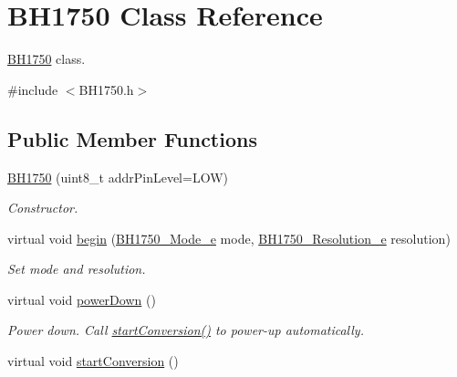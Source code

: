 \hypertarget{class_b_h1750}{}\section{B\+H1750 Class Reference}
\label{class_b_h1750}


\hyperlink{class_b_h1750}{B\+H1750} class.  




{\ttfamily \#include $<$B\+H1750.\+h$>$}

\subsection*{Public Member Functions}
\begin{DoxyCompactItemize}
\item 
\hyperlink{class_b_h1750_aa0f66027401db3cd8eb849456b820c39}{B\+H1750} (uint8\+\_\+t addr\+Pin\+Level=L\+OW)
\begin{DoxyCompactList}\small\item\em Constructor. \end{DoxyCompactList}\item 
virtual void \hyperlink{class_b_h1750_aa32b8ff6bf4d7888f776bc42303075a2}{begin} (\hyperlink{_b_h1750_8h_adcb5f510996efd1d596b2e65ffc7892b}{B\+H1750\+\_\+\+Mode\+\_\+e} mode, \hyperlink{_b_h1750_8h_a596339813d6a64d82e6477f6b7825b3d}{B\+H1750\+\_\+\+Resolution\+\_\+e} resolution)
\begin{DoxyCompactList}\small\item\em Set mode and resolution. \end{DoxyCompactList}\item 
virtual void \hyperlink{class_b_h1750_ae9c0efac4daa5a16c1a732c0aafbc6c0}{power\+Down} ()\hypertarget{class_b_h1750_ae9c0efac4daa5a16c1a732c0aafbc6c0}{}\label{class_b_h1750_ae9c0efac4daa5a16c1a732c0aafbc6c0}

\begin{DoxyCompactList}\small\item\em Power down. Call \hyperlink{class_b_h1750_ae637c8d230c873bc22ee836a7f878dfe}{start\+Conversion()} to power-\/up automatically. \end{DoxyCompactList}\item 
virtual void \hyperlink{class_b_h1750_ae637c8d230c873bc22ee836a7f878dfe}{start\+Conversion} ()\hypertarget{class_b_h1750_ae637c8d230c873bc22ee836a7f878dfe}{}\label{class_b_h1750_ae637c8d230c873bc22ee836a7f878dfe}


\end{DoxyCompactItemize}

